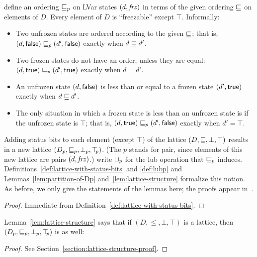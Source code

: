  define an ordering $\sqsubseteq_p$ on LVar states $(d, \mathit{frz})$ in
terms of the given ordering $\sqsubseteq$ on elements of
$D$.  Every element of $D$ is ``freezable'' except $\top$.
Informally:
\begin{itemize}
\item Two unfrozen states are ordered according to the
  given $\sqsubseteq$; that is, $(d, \textsf{false})
  \sqsubseteq_p (d', \textsf{false})$ exactly when $d \sqsubseteq d'$.
\item Two frozen states do not have an order, unless they are equal:
  $(d, \textsf{true}) \sqsubseteq_p (d', \textsf{true})$ exactly when
  $d = d'$.
\item An unfrozen state $(d, \textsf{false})$ is less than or
  equal to a frozen state $(d', \textsf{true})$ exactly when $d
  \sqsubseteq d'$.
\item The only situation in which a frozen state is less than an
  unfrozen state is if the unfrozen state is $\top$; that is,
  $(d, \textsf{true}) \sqsubseteq_p (d', \textsf{false})$ exactly when
  $d' = \top$.
\end{itemize}
Adding status bits to each element (except $\top$) of the lattice $(D,
\sqsubseteq, \bot, \top)$ results in a new lattice $(D_p, \sqsubseteq_p, \bot_{p},
\top\hspace{-0.85mm}_{p})$.  (The $p$ stands for pair, since elements of this new lattice
are pairs $(d, \mathit{frz})$.)  write $ \sqcup_p $ for the lub
operation that $\sqsubseteq_p$ induces.
Definitions~\ref{def:lattice-with-status-bits} and \ref{def:lubp} and
Lemmas~\ref{lem:partition-of-Dp} and~\ref{lem:lattice-structure}
formalize this notion.
\ifdefined\JOURNAL
As before, we only give the statements of the lemmas here; the proofs
appear in~\cite{lvars-dissertation}.
\fi

\DefLatticeWithStatusBits

\LemPartitionOfDp
\ifdefined\DISSERTATION
\begin{proof}
  Immediate from Definition~\ref{def:lattice-with-status-bits}.
\end{proof}
\fi

\DefLubP

Lemma~\ref{lem:lattice-structure} says that if $(D, \leq, \bot, \top)$
is a lattice, then $(D_p, \sqsubseteq_p, \bot_{p}, \top\hspace{-0.85mm}_{p})$ is as well:

\LemLatticeStructure
\ifdefined\DISSERTATION
\begin{proof}
See Section~\ref{section:lattice-structure-proof}.
\end{proof}
\fi

